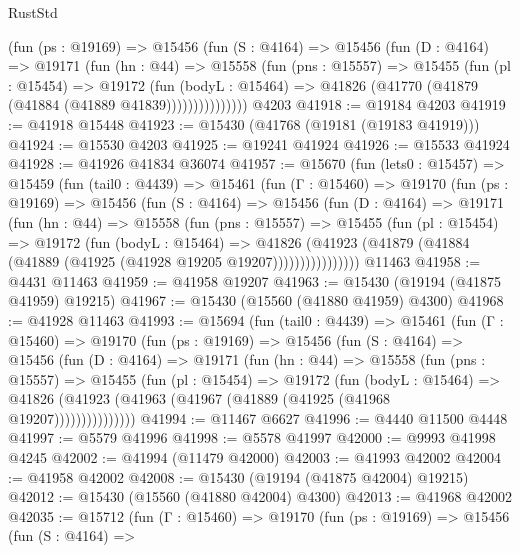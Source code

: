 \begin{lexlean}{RustStd}
\begin{coremodule}
{\begin{coremodule}
{{{{{{{{{{{{{{{{{{{{{{{{{{{{{{{{{{{{{{{{{{{{{{{{{{{{{{{{{{{{            (fun (ps : @19169) =>
            @15456
              (fun (S : @4164) =>
              @15456
                (fun (D : @4164) =>
                @19171
                  (fun (hn : @44) =>
                  @15558
                    (fun (pns : @15557) =>
                    @15455
                      (fun (pl : @15454) =>
                      @19172
                        (fun (bodyL : @15464) =>
                        @41826 (@41770 (@41879 (@41884 (@41889 @41839)))))))))))))))
    @4203
@41918 := @19184 @4203
@41919 := @41918 @15448
@41923 := @15430 (@41768 (@19181 (@19183 @41919)))
@41924 := @15530 @4203
@41925 := @19241 @41924
@41926 := @15533 @41924
@41928 := @41926 @41834 @36074
@41957 := @15670
    (fun (lets0 : @15457) =>
    @15459
      (fun (tail0 : @4439) =>
      @15461
        (fun (Γ : @15460) =>
        @19170
          (fun (ps : @19169) =>
          @15456
            (fun (S : @4164) =>
            @15456
              (fun (D : @4164) =>
              @19171
                (fun (hn : @44) =>
                @15558
                  (fun (pns : @15557) =>
                  @15455
                    (fun (pl : @15454) =>
                    @19172
                      (fun (bodyL : @15464) =>
                      @41826
                        (@41923
                          (@41879 (@41884 (@41889 (@41925 (@41928 @19205 @19207))))))))))))))))
    @11463
@41958 := @4431 @11463
@41959 := @41958 @19207
@41963 := @15430 (@19194 (@41875 @41959) @19215)
@41967 := @15430 (@15560 (@41880 @41959) @4300)
@41968 := @41928 @11463
@41993 := @15694
    (fun (tail0 : @4439) =>
    @15461
      (fun (Γ : @15460) =>
      @19170
        (fun (ps : @19169) =>
        @15456
          (fun (S : @4164) =>
          @15456
            (fun (D : @4164) =>
            @19171
              (fun (hn : @44) =>
              @15558
                (fun (pns : @15557) =>
                @15455
                  (fun (pl : @15454) =>
                  @19172
                    (fun (bodyL : @15464) =>
                    @41826 (@41923 (@41963 (@41967 (@41889 (@41925 (@41968 @19207)))))))))))))))
@41994 := @11467 @6627
@41996 := @4440 @11500 @4448
@41997 := @5579 @41996
@41998 := @5578 @41997
@42000 := @9993 @41998 @4245
@42002 := @41994 (@11479 @42000)
@42003 := @41993 @42002
@42004 := @41958 @42002
@42008 := @15430 (@19194 (@41875 @42004) @19215)
@42012 := @15430 (@15560 (@41880 @42004) @4300)
@42013 := @41968 @42002
@42035 := @15712
    (fun (Γ : @15460) =>
    @19170
      (fun (ps : @19169) =>
      @15456
        (fun (S : @4164) =>
}}}}}}}}}}}}}}}}}}}}}}}}}}}}}}}}}}}}}}}}}}}}}}}}}}}}}}}}}}}}
\end{coremodule}}
\end{coremodule}
\end{lexlean}
